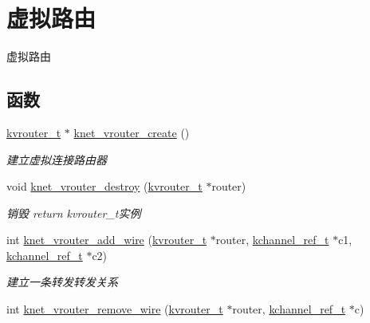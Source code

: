 \hypertarget{a00124}{}\section{虚拟路由}
\label{a00124}


虚拟路由  


\subsection*{函数}
\begin{DoxyCompactItemize}
\item 
\hyperlink{a00056_a9863a6202df1fb40e2b32c673ad93267_a9863a6202df1fb40e2b32c673ad93267}{kvrouter\+\_\+t} $\ast$ \hyperlink{a00124_gac2a99e706273f22db2ea363b1700bfab_gac2a99e706273f22db2ea363b1700bfab}{knet\+\_\+vrouter\+\_\+create} ()
\begin{DoxyCompactList}\small\item\em 建立虚拟连接路由器 \end{DoxyCompactList}\item 
void \hyperlink{a00124_gad0660abac611870c1255dcfe9d36f67e_gad0660abac611870c1255dcfe9d36f67e}{knet\+\_\+vrouter\+\_\+destroy} (\hyperlink{a00056_a9863a6202df1fb40e2b32c673ad93267_a9863a6202df1fb40e2b32c673ad93267}{kvrouter\+\_\+t} $\ast$router)
\begin{DoxyCompactList}\small\item\em 销毁 return kvrouter\+\_\+t实例 \end{DoxyCompactList}\item 
int \hyperlink{a00124_ga7256979701c32356201e853b7f3df1ca_ga7256979701c32356201e853b7f3df1ca}{knet\+\_\+vrouter\+\_\+add\+\_\+wire} (\hyperlink{a00056_a9863a6202df1fb40e2b32c673ad93267_a9863a6202df1fb40e2b32c673ad93267}{kvrouter\+\_\+t} $\ast$router, \hyperlink{a00056_a3b7e82599367eade261456f60ebe2cd9_a3b7e82599367eade261456f60ebe2cd9}{kchannel\+\_\+ref\+\_\+t} $\ast$c1, \hyperlink{a00056_a3b7e82599367eade261456f60ebe2cd9_a3b7e82599367eade261456f60ebe2cd9}{kchannel\+\_\+ref\+\_\+t} $\ast$c2)
\begin{DoxyCompactList}\small\item\em 建立一条转发转发关系 \end{DoxyCompactList}\item 
int \hyperlink{a00124_gaa5052bac7f443e497fcc042f13026bfc_gaa5052bac7f443e497fcc042f13026bfc}{knet\+\_\+vrouter\+\_\+remove\+\_\+wire} (\hyperlink{a00056_a9863a6202df1fb40e2b32c673ad93267_a9863a6202df1fb40e2b32c673ad93267}{kvrouter\+\_\+t} $\ast$router, \hyperlink{a00056_a3b7e82599367eade261456f60ebe2cd9_a3b7e82599367eade261456f60ebe2cd9}{kchannel\+\_\+ref\+\_\+t} $\ast$c)

\end{DoxyCompactItemize}
